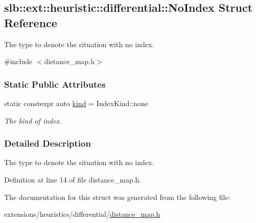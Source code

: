 \hypertarget{structslb_1_1ext_1_1heuristic_1_1differential_1_1NoIndex}{}\subsection{slb\+:\+:ext\+:\+:heuristic\+:\+:differential\+:\+:No\+Index Struct Reference}
\label{structslb_1_1ext_1_1heuristic_1_1differential_1_1NoIndex}


The type to denote the situation with no index.  




{\ttfamily \#include $<$distance\+\_\+map.\+h$>$}

\subsubsection*{Static Public Attributes}
\begin{DoxyCompactItemize}
\item 
static constexpr auto \hyperlink{structslb_1_1ext_1_1heuristic_1_1differential_1_1NoIndex_aa15645dd22f7123c4a4d6e1622e5afbc}{kind} = Index\+Kind\+::none\hypertarget{structslb_1_1ext_1_1heuristic_1_1differential_1_1NoIndex_aa15645dd22f7123c4a4d6e1622e5afbc}{}\label{structslb_1_1ext_1_1heuristic_1_1differential_1_1NoIndex_aa15645dd22f7123c4a4d6e1622e5afbc}

\begin{DoxyCompactList}\small\item\em The kind of index. \end{DoxyCompactList}\end{DoxyCompactItemize}


\subsubsection{Detailed Description}
The type to denote the situation with no index. 

Definition at line 14 of file distance\+\_\+map.\+h.



The documentation for this struct was generated from the following file\+:\begin{DoxyCompactItemize}
\item 
extensions/heuristics/differential/\hyperlink{distance__map_8h}{distance\+\_\+map.\+h}\end{DoxyCompactItemize}
